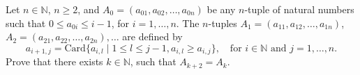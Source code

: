 Let $n \in \mathbb{N}$, $n \geq 2$, and $A_0 = (a_{01}, a_{02}, \ldots, a_{0n})$ be any $n$-tuple of natural numbers such that $0 \leq a_{0i} \leq i-1$, for $i = 1, \ldots, n$. The $n$-tuples $A_1 = (a_{11}, a_{12}, \ldots, a_{1n})$, $A_2 = (a_{21}, a_{22}, \ldots, a_{2n}), \ldots$ are defined by
\[ a_{i+1,j} = \mathrm{Card}\{a_{i,l} \mid 1 \leq l \leq j-1, a_{i,l} \geq a_{i,j}\}, \quad \text{for } i \in \mathbb{N} \text{ and } j = 1, \ldots, n. \]
Prove that there exists $k \in \mathbb{N}$, such that $A_{k+2} = A_k$.
